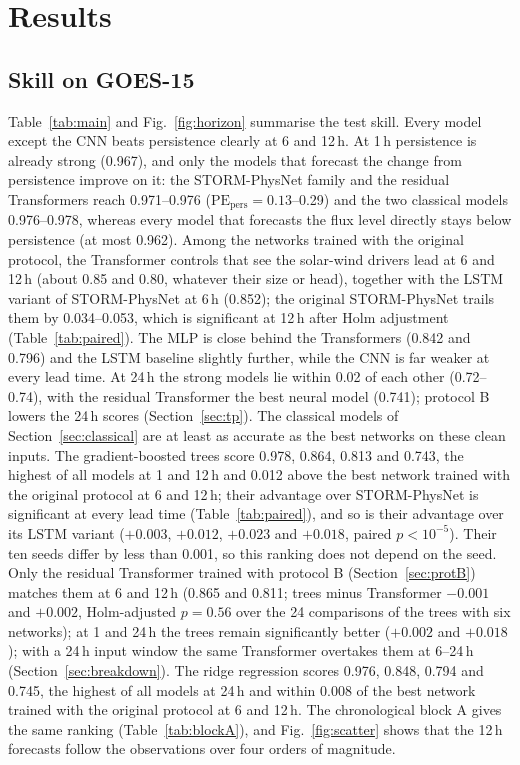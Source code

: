 \documentclass[a4paper,fleqn]{cas-dc}
\newcommand{\PE}{\mathrm{PE}}
\begin{document}
\section{Results}
\label{sec:results}
\subsection{Skill on GOES-15}
\label{sec:skill}
Table~\ref{tab:main} and Fig.~\ref{fig:horizon} summarise the test skill. Every model except the CNN beats
persistence clearly at 6 and 12\,h. At 1\,h persistence is already strong (0.967), and only the models that
forecast the change from persistence improve on it: the STORM-PhysNet family and the residual Transformers reach
0.971--0.976 (\(\PE_{\mathrm{pers}}=0.13\)--0.29) and the two classical models 0.976--0.978, whereas every model that forecasts the flux level directly
stays below persistence (at most 0.962). Among the networks trained with the original protocol, the Transformer controls that see the
solar-wind drivers lead at 6 and 12\,h (about 0.85 and 0.80, whatever their size or head), together with the LSTM variant of
STORM-PhysNet at 6\,h (0.852); the original STORM-PhysNet trails them by 0.034--0.053, which is significant at
12\,h after Holm adjustment (Table~\ref{tab:paired}). The MLP is close behind the Transformers (0.842 and 0.796)
and the LSTM baseline slightly further, while the CNN is far weaker at every lead time. At 24\,h the strong
models lie within 0.02 of each other (0.72--0.74), with the residual Transformer the best neural model (0.741); protocol B lowers the 24\,h scores
(Section~\ref{sec:tp}).
The classical models of Section~\ref{sec:classical} are at least as accurate as the best networks on these clean
inputs. The gradient-boosted trees score 0.978, 0.864, 0.813 and 0.743, the highest of all models at 1 and 12\,h
and 0.012 above the best network trained with the original protocol at 6 and 12\,h; their advantage over
STORM-PhysNet is significant at every lead time (Table~\ref{tab:paired}), and so is their advantage over its LSTM
variant (\(+0.003\), \(+0.012\), \(+0.023\) and \(+0.018\), paired \(p<10^{-5}\)). Their ten seeds differ by less than
0.001, so this ranking does not depend on the seed. Only the residual Transformer trained with protocol B
(Section~\ref{sec:protB}) matches them at 6 and 12\,h (0.865 and 0.811; trees minus Transformer \(-0.001\) and
\(+0.002\), Holm-adjusted \(p=0.56\) over the 24 comparisons of the trees with six networks); at 1 and 24\,h the
trees remain significantly better (\(+0.002\) and \(+0.018\)); with a 24\,h input window the same Transformer
overtakes them at 6--24\,h (Section~\ref{sec:breakdown}). The ridge regression scores 0.976, 0.848, 0.794 and 0.745, the highest of all models at 24\,h and within
0.008 of the best network trained with the original protocol at 6 and 12\,h. The
chronological block A gives the same ranking (Table~\ref{tab:blockA}), and Fig.~\ref{fig:scatter} shows that
the 12\,h forecasts follow the observations over four orders of magnitude.
\end{document}
